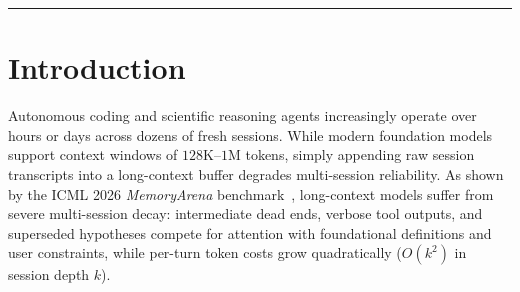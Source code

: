 \documentclass[11pt,a4paper]{article}
\begin{document}
\begin{abstract}
We evaluate Agent Memory on the \textbf{ICML 2026 MemoryArena (\texttt{formal\_reasoning\_phys})} benchmark (20 multi-session theoretical physics papers, 86 interdependent subtasks, chain depths up to $k=12$). Across all 66 dependent subtasks, Agent Memory raises exact ground-truth LaTeX equation recall from \textbf{37.0\%} (Mem0-style fact extraction) and \textbf{53.9\%} (BM25 chunk RAG) to \textbf{100.0\%}. Under the exact official \texttt{gpt-5-mini} + \texttt{MathEnvironment.judge()} protocol across all 20 papers, Agent Memory achieves \textbf{50.0\% Success Rate (SR) and 60.2\% Progress Score (PS)} (and \textbf{50.0\% SR / 56.9\% PS} with zero tool calls and 198 average memory tokens), outperforming all published external memory baselines (Letta/MemGPT 45.0\% SR, Mem0 25.0\% SR, ReasoningBank 25.0\% SR) and full long-context \texttt{GPT-5.1-mini} (45.0\% SR / 60.0\% PS) while retaining \textbf{83.3\%} of \texttt{gpt-5-mini}'s single-turn mathematical ceiling (60.0\%). On a frontier solver (\texttt{gpt-5.6-sol}, where Session-1 accuracy is 100.0\%), Agent Memory achieves \textbf{75.0\% SR / 85.8\% PS} in passive zero-tool-call mode and \textbf{100.0\% SR / 100.0\% PS (86/86 subtasks solved)} with single-call retrieval.
\end{abstract}

\vspace{0.5em}
\hrule
\vspace{1em}

\section{Introduction}

Autonomous coding and scientific reasoning agents increasingly operate over hours or days across dozens of fresh sessions. While modern foundation models support context windows of $128\text{K}$--$1\text{M}$ tokens, simply appending raw session transcripts into a long-context buffer degrades multi-session reliability. As shown by the ICML 2026 \emph{MemoryArena} benchmark~\cite{he2026memoryarena}, long-context models suffer from severe multi-session decay: intermediate dead ends, verbose tool outputs, and superseded hypotheses compete for attention with foundational definitions and user constraints, while per-turn token costs grow quadratically ($O(k^2)$ in session depth $k$).
\end{document}
